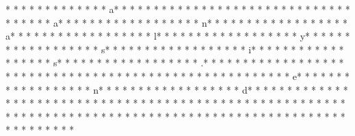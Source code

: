 *  * * *  *  * * *  *  * * *  * a* * *  * * *  * * *  *  * * *  *  * * *  *  * * *  * * *  * * *  *  * * *  *  * * *  * a* * *  * * *  * * *  *  * * *  *  * * *  * n* * *  * * *  * * *  *  * * *  *  * * *  * a* * *  * * *  * * *  *  * * *  *  * * *  * l* * *  * * *  * * *  *  * * *  *  * * *  * y* * *  * * *  * * *  *  * * *  *  * * *  * s* * *  * * *  * * *  *  * * *  *  * * *  * i* * *  * * *  * * *  *  * * *  *  * * *  * s* * *  * * *  * * *  *  * * *  *  * * *  * .* * *  * * *  * * *  *  * * *  *  * * *  * 
* * *  * * *  * * *  *  * * *  *  * * *  * 	* * *  * * *  * * *  *  * * *  *  * * *  * e* * *  * * *  * * *  *  * * *  *  * * *  * n* * *  * * *  * * *  *  * * *  *  * * *  * d* * *  * * *  * * *  *  * * *  *  * * *  * {* * *  * * *  * * *  *  * * *  *  * * *  *  * * *  * * *  * * *  *  * * *  *  * * *  * }* * *  * * *  * * *  *  * * *  *  * * *  * 
* * *  * * *  * * *  *  * * *  *  * * *  * 	* * *  * * *  * * *  *  * * *  *  * * *  * 
